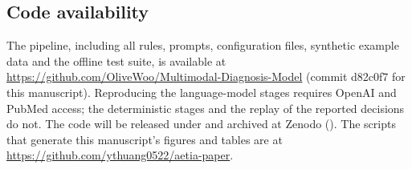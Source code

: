 \subsection*{Code availability}
The \toolname pipeline, including all rules, prompts, configuration files, synthetic example data and the offline test suite, is available at \url{https://github.com/OliveWoo/Multimodal-Diagnosis-Model} (commit d82c0f7 for this manuscript). Reproducing the language-model stages requires OpenAI and PubMed access; the deterministic stages and the replay of the reported decisions do not. The code will be released under  and archived at Zenodo (). The scripts that generate this manuscript's figures and tables are at \url{https://github.com/ythuang0522/aetia-paper}.
